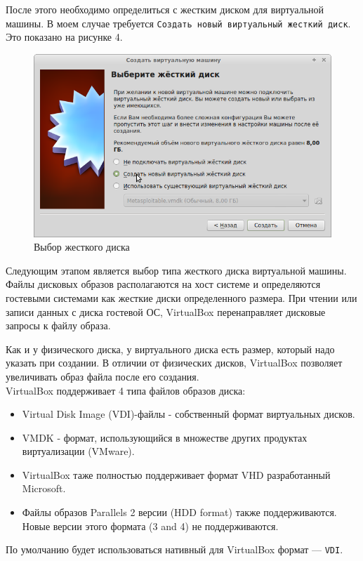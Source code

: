 \documentclass[12pt,a4paper]{article}
\begin{document}
После этого необходимо определиться с жестким диском для виртуальной машины. В моем случае требуется \verb+Создать новый виртуальный жесткий диск+. Это показано на рисунке 4.
\begin{figure}[h!]
\centering
\includegraphics[scale=0.5]{res/ROM}
\caption{Выбор жесткого диска}
\end{figure}

Следующим этапом является выбор типа жесткого диска виртуальной машины.
Файлы дисковых образов располагаются на хост системе и определяются гостевыми системами как жесткие диски определенного размера. При чтении или записи данных с диска гостевой ОС, VirtualBox перенаправляет дисковые запросы к файлу образа.

Как и у физического диска, у виртуального диска есть размер, который надо указать при создании. В отличии от физических дисков, VirtualBox позволяет увеличивать образ файла после его создания.\\
VirtualBox поддерживает 4 типа файлов образов диска:
\begin{itemize}
\item Virtual Disk Image (VDI)-файлы - собственный формат виртуальных дисков.
\item VMDK - формат, использующийся в множестве других продуктах виртуализации (VMware).
\item VirtualBox таже полностью поддерживает формат VHD разработанный Microsoft.
\item Файлы образов Parallels 2 версии (HDD format) также поддерживаются. Новые версии этого формата (3 and 4) не поддерживаются.
\end{itemize}

По умолчанию будет использоваться нативный для VirtualBox формат — \verb+VDI+.
\end{document}
